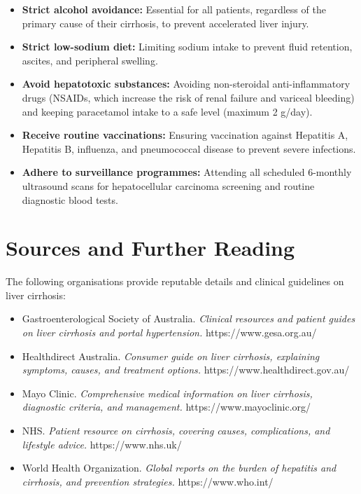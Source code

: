 \begin{itemize}
    \item \textbf{Strict alcohol avoidance:} Essential for all patients, regardless of the primary cause of their cirrhosis, to prevent accelerated liver injury.
    \item \textbf{Strict low-sodium diet:} Limiting sodium intake to prevent fluid retention, ascites, and peripheral swelling.
    \item \textbf{Avoid hepatotoxic substances:} Avoiding non-steroidal anti-inflammatory drugs (NSAIDs, which increase the risk of renal failure and variceal bleeding) and keeping paracetamol intake to a safe level (maximum 2 g/day).
    \item \textbf{Receive routine vaccinations:} Ensuring vaccination against Hepatitis A, Hepatitis B, influenza, and pneumococcal disease to prevent severe infections.
    \item \textbf{Adhere to surveillance programmes:} Attending all scheduled 6-monthly ultrasound scans for hepatocellular carcinoma screening and routine diagnostic blood tests.
\end{itemize}

\section*{Sources and Further Reading}
The following organisations provide reputable details and clinical guidelines on liver cirrhosis:

\begin{itemize}
    \item Gastroenterological Society of Australia. \textit{Clinical resources and patient guides on liver cirrhosis and portal hypertension.} https://www.gesa.org.au/
    \item Healthdirect Australia. \textit{Consumer guide on liver cirrhosis, explaining symptoms, causes, and treatment options.} https://www.healthdirect.gov.au/
    \item Mayo Clinic. \textit{Comprehensive medical information on liver cirrhosis, diagnostic criteria, and management.} https://www.mayoclinic.org/
    \item NHS. \textit{Patient resource on cirrhosis, covering causes, complications, and lifestyle advice.} https://www.nhs.uk/
    \item World Health Organization. \textit{Global reports on the burden of hepatitis and cirrhosis, and prevention strategies.} https://www.who.int/
\end{itemize}
